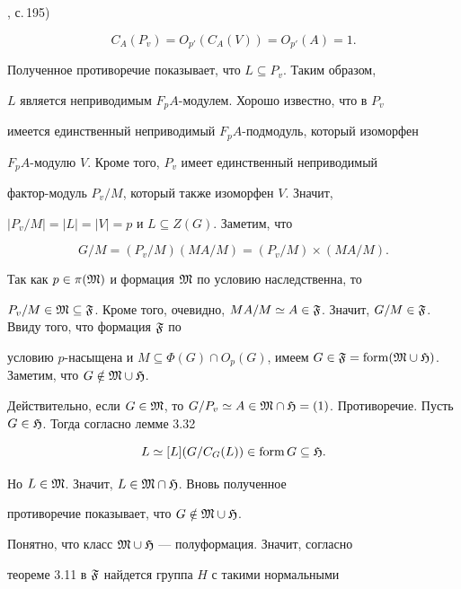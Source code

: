 \begin{pf}
\cite{Hup}, с.\,195) 


$$ 


C_A(P_v)=O_{p'}(C_A(V))=O_{p'}(A)=1. 


$$ 


Полученное противоречие показывает, что $L\subseteq P_v$. Таким образом, 


$L$ является неприводимым $F_pA$-модулем. Хорошо известно, что в $P_v$ 


имеется единственный неприводимый $F_pA$-подмодуль, который изоморфен 


$F_pA$-модулю $V$. Кроме того, $P_v$ имеет единственный неприводимый 


фактор-модуль $P_v/M$, который также изоморфен $V$. Значит, 


$|P_v/M|=|L|=|V|=p$ и $L\subseteq Z(G)$. Заметим, что 


$$ 


G/M=(P_v/M)(MA/M)=(P_v/M)\times(MA/M). 


$$ 


Так как $p\in\pi(\frak M)$ и формация $\frak M$ по условию наследственна, то 


$P_v/M\in\frak M\subseteq\frak F$. Кроме того, очевидно, $MA/M\simeq A\in 


\frak F$. Значит, $G/M\in\frak F$. Ввиду того, что формация $\frak F$ по 


условию $p$-насыщена и $M\subseteq\Phi(G)\cap O_p(G)$, имеем $G\in\frak 


F=\form(\frak M\cup\frak H)$. Заметим, что $G\notin\frak M\cup\frak H$. 


Действительно, если $G\in\frak M$, то $G/P_v\simeq A\in\frak M\cap\frak 


H=(1)$. Противоречие. Пусть $G\in\frak H$. Тогда согласно лемме 3.32 


\cite{She3} 


$$ 


L\simeq [L](G/C_G(L))\in\form G\subseteq \frak H. 


$$ 


Но $L\in \frak M$. Значит, $L\in\frak M\cap\frak H$. Вновь полученное 


противоречие показывает, что $G\notin\frak M\cup\frak H$. 


 


Понятно, что класс $\frak M\cup\frak H$ --- полуформация. Значит, согласно 


теореме 3.11 \cite{She3} в $\frak F$ найдется группа $H$ с такими нормальными 



\end{pf}
